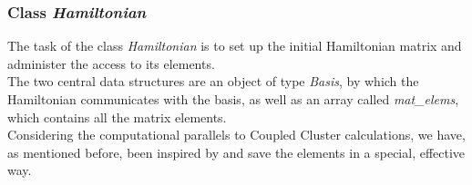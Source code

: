 \subsubsection{Class \textit{Hamiltonian}}

The task of the class \textit{Hamiltonian} is to set up the initial Hamiltonian matrix and administer the access to its elements.\\
The two central data structures are an object of type \textit{Basis}, by which the Hamiltonian communicates with the basis, as well as an array called \textit{mat\_elems}, which contains all the matrix elements.\\
Considering the computational parallels to Coupled Cluster calculations, we have, as mentioned before, been inspired by \cite{Marte,Christoffer} and save the elements in a special, effective way. 

